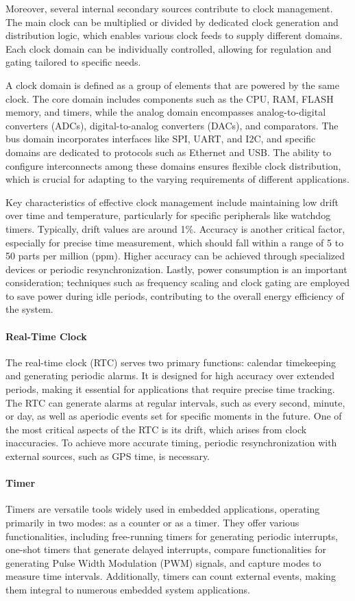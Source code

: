 Moreover, several internal secondary sources contribute to clock management. 
The main clock can be multiplied or divided by dedicated clock generation and distribution logic, which enables various clock feeds to supply different domains. 
Each clock domain can be individually controlled, allowing for regulation and gating tailored to specific needs.

A clock domain is defined as a group of elements that are powered by the same clock. 
The core domain includes components such as the CPU, RAM, FLASH memory, and timers, while the analog domain encompasses analog-to-digital converters (ADCs), digital-to-analog converters (DACs), and comparators. 
The bus domain incorporates interfaces like SPI, UART, and I2C, and specific domains are dedicated to protocols such as Ethernet and USB. 
The ability to configure interconnects among these domains ensures flexible clock distribution, which is crucial for adapting to the varying requirements of different applications.

Key characteristics of effective clock management include maintaining low drift over time and temperature, particularly for specific peripherals like watchdog timers. 
Typically, drift values are around 1\%. 
Accuracy is another critical factor, especially for precise time measurement, which should fall within a range of 5 to 50 parts per million (ppm). 
Higher accuracy can be achieved through specialized devices or periodic resynchronization. Lastly, power consumption is an important consideration; techniques such as frequency scaling and clock gating are employed to save power during idle periods, contributing to the overall energy efficiency of the system.

\paragraph*{Real-Time Clock}
The real-time clock (RTC) serves two primary functions: calendar timekeeping and generating periodic alarms.
It is designed for high accuracy over extended periods, making it essential for applications that require precise time tracking. 
The RTC can generate alarms at regular intervals, such as every second, minute, or day, as well as aperiodic events set for specific moments in the future.
One of the most critical aspects of the RTC is its drift, which arises from clock inaccuracies. 
To achieve more accurate timing, periodic resynchronization with external sources, such as GPS time, is necessary.

\paragraph*{Timer}
Timers are versatile tools widely used in embedded applications, operating primarily in two modes: as a counter or as a timer. 
They offer various functionalities, including free-running timers for generating periodic interrupts, one-shot timers that generate delayed interrupts, compare functionalities for generating Pulse Width Modulation (PWM) signals, and capture modes to measure time intervals. 
Additionally, timers can count external events, making them integral to numerous embedded system applications.

